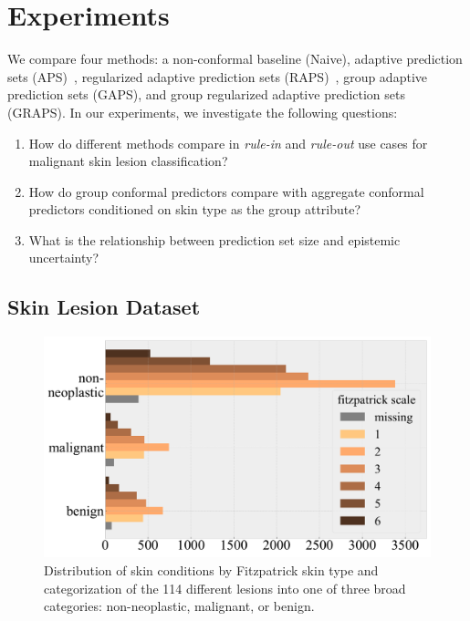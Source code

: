 \documentclass[letterpaper]{article} %
\begin{document}
\section{Experiments}
We compare four methods: a non-conformal baseline (Naive), adaptive prediction sets (APS)~\cite{NEURIPS2020_244edd7e}, regularized adaptive prediction sets (RAPS)~\cite{angelopoulos2021uncertainty}, group adaptive prediction sets (GAPS), and group regularized adaptive prediction sets (GRAPS).
In our experiments, we investigate the following questions:
\begin{enumerate}
\item How do different methods compare in \textit{rule-in} and \textit{rule-out} use cases for malignant skin lesion classification?
\item How do group conformal predictors compare with aggregate conformal predictors conditioned on skin type as the group attribute?
\item What is the relationship between prediction set size and epistemic uncertainty?
\end{enumerate}

\subsection{Skin Lesion Dataset}
\begin{figure}[t]
\centering
\includegraphics[width=0.99\columnwidth]{LaTeX/fitz-subgroup-class-dist.pdf}
\caption{Distribution of skin conditions by Fitzpatrick skin type and categorization of the 114 different lesions into one of three broad categories: non-neoplastic, malignant, or benign.}
\label{fig:fitz-dist}
\end{figure}
\end{document}
